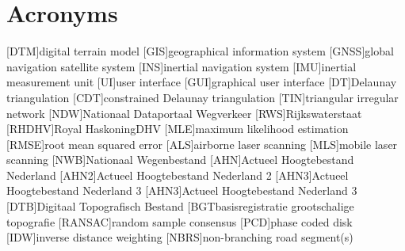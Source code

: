 \chapter*{Acronyms}

\begin{acronym}[UML]
  [DTM]{digital terrain model}
  [GIS]{geographical information system}
  [GNSS]{global navigation satellite system}
  [INS]{inertial navigation system}
  [IMU]{inertial measurement unit}
  [UI]{user interface}
  [GUI]{graphical user interface}
  [DT]{Delaunay triangulation}
  [CDT]{constrained Delaunay triangulation}
  [TIN]{triangular irregular network}
  [NDW]{Nationaal Dataportaal Wegverkeer}
  [RWS]{Rijkswaterstaat}
  [RHDHV]{Royal HaskoningDHV}
  [MLE]{maximum likelihood estimation}
  [RMSE]{root mean squared error}
  [ALS]{airborne laser scanning}
  [MLS]{mobile laser scanning}
  [NWB]{Nationaal Wegenbestand}
  [AHN]{Actueel Hoogtebestand Nederland}
  [AHN2]{Actueel Hoogtebestand Nederland 2}
  [AHN3]{Actueel Hoogtebestand Nederland 3}
  [AHN3]{Actueel Hoogtebestand Nederland 3}
  [DTB]{Digitaal Topografisch Bestand}
  [BGT{basisregistratie grootschalige topografie}
  [RANSAC]{random sample consensus}
  [PCD]{phase coded disk}
  [IDW]{inverse distance weighting}
  [NBRS]{non-branching road segment(s)}
\end{acronym}
